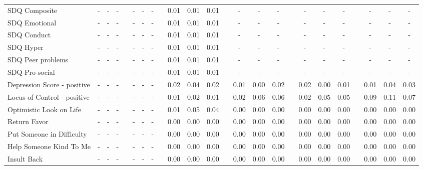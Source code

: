 \begin{center}
{\begin{longtable}{L{12em} c c c p{1.2em} c c c p{1.2em} c c c p{1.2em} c c c p{1.2em} c c c p{1.2em} c c c}
SDQ Composite & - & - & - & & - & - & - & &      0.01 &      0.01 &      0.01 & & - & - & - & & - & - & - & & - & - & - \\[.3em]
SDQ Emotional & - & - & - & & - & - & - & &      0.01 &      0.01 &      0.01 & & - & - & - & & - & - & - & & - & - & - \\[.3em]
SDQ Conduct & - & - & - & & - & - & - & &      0.01 &      0.01 &      0.01 & & - & - & - & & - & - & - & & - & - & - \\[.3em]
SDQ Hyper & - & - & - & & - & - & - & &      0.01 &      0.01 &      0.01 & & - & - & - & & - & - & - & & - & - & - \\[.3em]
SDQ Peer problems & - & - & - & & - & - & - & &      0.01 &      0.01 &      0.01 & & - & - & - & & - & - & - & & - & - & - \\[.3em]
SDQ Pro-social & - & - & - & & - & - & - & &      0.01 &      0.01 &      0.01 & & - & - & - & & - & - & - & & - & - & - \\[.3em]
Depression Score - positive & - & - & - & & - & - & - & &      0.02 &      0.04 &      0.02 & &      0.01 &      0.00 &      0.02 & &      0.02 &      0.00 &      0.01 & &      0.01 &      0.04 &      0.03 \\[.3em]
Locus of Control - positive & - & - & - & & - & - & - & &      0.01 &      0.02 &      0.01 & &      0.02 &      0.06 &      0.06 & &      0.02 &      0.05 &      0.05 & &      0.09 &      0.11 &      0.07 \\[.3em]
Optimistic Look on Life & - & - & - & & - & - & - & &      0.01 &      0.05 &      0.04 & &      0.00 &      0.00 &      0.00 & &      0.00 &      0.00 &      0.00 & &      0.00 &      0.00 &      0.00 \\[.3em]
Return Favor & - & - & - & & - & - & - & &      0.00 &      0.00 &      0.00 & &      0.00 &      0.00 &      0.00 & &      0.00 &      0.00 &      0.00 & &      0.00 &      0.00 &      0.00 \\[.3em]
Put Someone in Difficulty & - & - & - & & - & - & - & &      0.00 &      0.00 &      0.00 & &      0.00 &      0.00 &      0.00 & &      0.00 &      0.00 &      0.00 & &      0.00 &      0.00 &      0.00 \\[.3em]
Help Someone Kind To Me & - & - & - & & - & - & - & &      0.00 &      0.00 &      0.00 & &      0.00 &      0.00 &      0.00 & &      0.00 &      0.00 &      0.00 & &      0.00 &      0.00 &      0.00 \\[.3em]
Insult Back & - & - & - & & - & - & - & &      0.00 &      0.00 &      0.00 & &      0.00 &      0.00 &      0.00 & &      0.00 &      0.00 &      0.00 & &      0.00 &      0.00 &      0.00 \\[.3em]

\end{longtable}}
\end{center}
